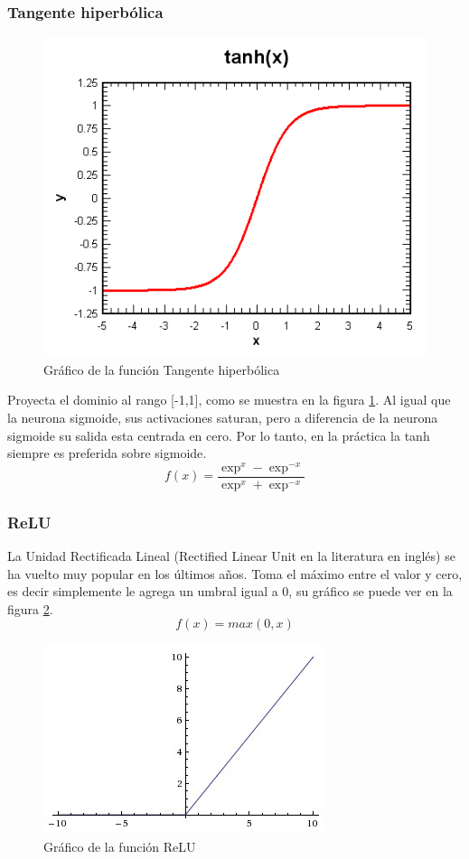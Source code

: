 \documentclass[a4paper,11pt,spanish]{book}
\begin{document}
	  \subsubsection {Tangente hiperbólica}
	    \begin{figure}[ht]
	      \begin{center}
	       \includegraphics[width=0.4\linewidth]{./img/tanh.png}
	      \end{center}
	      \caption{Gráfico de la función Tangente hiperbólica}
	      \label{fig:tanh}
	    \end{figure}
	    Proyecta el dominio al rango [-1,1], como se muestra en la figura \ref{fig:tanh}. Al igual que la neurona sigmoide, sus activaciones saturan, pero a diferencia
	    de la neurona sigmoide su salida esta centrada en cero. Por lo tanto, en la práctica la tanh siempre es preferida sobre sigmoide.
	    \begin{equation*}
	     f(x) = \frac{\exp^x - \exp^{-x}}{\exp^x + \exp^{-x}}
	    \end{equation*}

	  \subsubsection {ReLU}
	    La Unidad Rectificada Lineal (Rectified Linear Unit en la literatura en inglés) se ha vuelto muy popular en los últimos años. Toma el máximo entre el valor y cero, es decir
	    simplemente le agrega un umbral igual a 0, su gráfico se puede ver en la figura \ref{fig:relu}.
	    \begin{equation}
	     f(x) = max(0,x)
	    \end{equation}
	    \begin{figure}[ht]
	      \begin{center}
	       \includegraphics[width=0.4\linewidth]{./img/relu.jpeg}
	      \end{center}
	      \caption{Gráfico de la función ReLU}
	      \label{fig:relu}
	    \end{figure}
\end{document}
